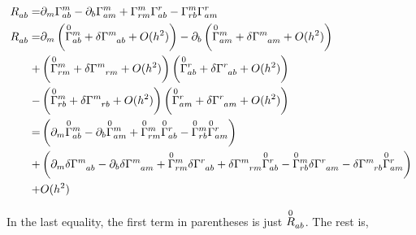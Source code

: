 \begin{align*}  
     \tt{R}{}{ab}=& \ricci{a}{b}{m}{r}\\
    \tt{R}{}{ab}=& \partial_{m}\lera{\ttw{\overset{0}{\Gamma}{}}{m}{ab} + \delta\tt{\Gamma}{m}{ab}+ O(h^2)} - \partial_{b}\lera{\ttw{\overset{0}{\Gamma}{}}{m}{am} + \delta\tt{\Gamma}{m}{am}+ O(h^2)}\\
    +&\lera{\ttw{\overset{0}{\Gamma}{}}{m}{rm} + \delta\tt{\Gamma}{m}{rm}+ O(h^2)}\lera{\ttw{\overset{0}{\Gamma}{}}{r}{ab} + \delta\tt{\Gamma}{r}{ab}+ O(h^2)}\\
    -&\lera{\ttw{\overset{0}{\Gamma}{}}{m}{rb} + \delta\tt{\Gamma}{m}{rb}+ O(h^2)}\lera{\ttw{\overset{0}{\Gamma}{}}{r}{am} + \delta\tt{\Gamma}{r}{am}+ O(h^2)}\\
    =&\left(\partial_m\ttw{\overset{0}{\Gamma}{}}{m}{ab} - \partial_b\ttw{\overset{0}{\Gamma}{}}{m}{am}+ \ttw{\overset{0}{\Gamma}{}}{m}{rm}\ttw{\overset{0}{\Gamma}{}}{r}{ab} -\ttw{\overset{0}{\Gamma}{}}{m}{rb}\ttw{\overset{0}{\Gamma}{}}{r}{am}\right) \\
    +& \lera{\partial_m \tt{\delta\Gamma}{m}{ab}- \partial_b \tt{\delta\Gamma}{m}{am}+\ttw{\overset{0}{\Gamma}{}}{m}{rm}\tt{\delta\Gamma}{r}{ab}+\tt{\delta\Gamma}{m}{rm}\ttw{\overset{0}{\Gamma}{}}{r}{ab}-\ttw{\overset{0}{\Gamma}{}}{m}{rb}\tt{\delta\Gamma}{r}{am}-\tt{\delta\Gamma}{m}{rb}\ttw{\overset{0}{\Gamma}{}}{r}{am}} \\
    +& O(h^2)
\end{align*}


In the last equality, the first term in parentheses is just $\tt{\overset{0}{R}}{}{ab}$. The rest is,

